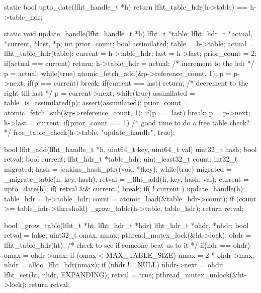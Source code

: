 \begin{center}
\begin{clisting}
static bool upto_date(lfht_handle_t *h){
  return lfht_table_hdr(h->table) == h->table_hdr;
}

static void update_handle(lfht_handle_t *h){
  lfht_t *table;
  lfht_hdr_t *actual, *current, *last, *p;
  int prior_count;
  bool assimilated;
  table = h->table;
  actual = lfht_table_hdr(table);
  current  = h->table_hdr;
  last = h->last;
  prior_count = 2;
  if(actual == current){
    return;
  }
  h->table_hdr = actual;
  /* increment to the left */
  p = actual;
  while(true){
    atomic_fetch_add(&p->reference_count, 1);
    p = p->next;
    if(p == current){ break; }
  }
  if(current == last){  return; }
  /* decrement to the right till last */
  p = current->next;
  while(true){
    assimilated = table_is_assimilated(p);
    assert(assimilated);
    prior_count = atomic_fetch_sub(&p->reference_count, 1);
    if(p == last){ break; }
    p = p->next;
  }
  h->last = current;
  if(prior_count == 1){
    /* good time to do a free table check? */
    free_table_check(h->table, "update_handle", true);
  }
}
\end{clisting}
\end{center}

\begin{center}
\begin{clisting}
bool lfht_add(lfht_handle_t *h, uint64_t key, uint64_t val){
  uint32_t hash;
  bool retval;
  bool current;
  lfht_hdr_t *table_hdr;
  uint_least32_t count;
  int32_t migrated;
  hash = jenkins_hash_ptr((void *)key);
  while(true){
    migrated = _migrate_table(h, key, hash);
    retval = _lfht_add(h, key, hash, val);
    current = upto_date(h);
    if( retval && current ){ break; }
    if( ! current ){ update_handle(h); }
  }
  table_hdr = h->table_hdr;
  count = atomic_load(&table_hdr->count);
  if (count >= table_hdr->threshold){
    _grow_table(h->table, table_hdr);
  }
  return retval;
}

\end{clisting}
\end{center}




\begin{center}
\begin{clisting}
bool _grow_table(lfht_t *ht,  lfht_hdr_t *hdr){
  lfht_hdr_t *ohdr, *nhdr;
  bool retval = false;
  uint32_t omax, nmax;
  pthread_mutex_lock(&ht->lock);
  ohdr = lfht_table_hdr(ht);
  /* check to see if someone beat us to it */
  if(hdr == ohdr){
    omax = ohdr->max;
    if (omax < MAX_TABLE_SIZE) {
      nmax = 2 * ohdr->max;
      nhdr  = alloc_lfht_hdr(nmax);
      if (nhdr != NULL){
	nhdr->next = ohdr;
	lfht_set(ht, nhdr, EXPANDING);
	retval = true;
      }
    }
  }
  pthread_mutex_unlock(&ht->lock);
  return retval;
}

\end{clisting}
\end{center}

